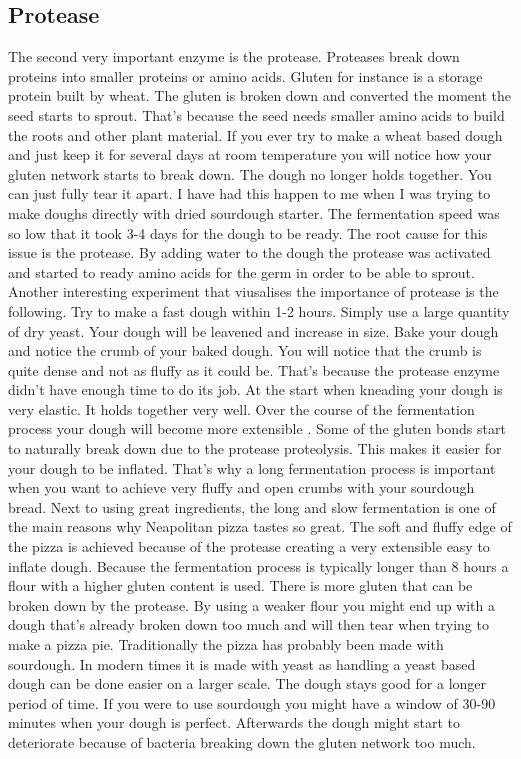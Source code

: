 \subsection{Protease}

The second very important enzyme is the protease. Proteases
break down proteins into smaller proteins or amino acids.
Gluten for instance is a storage protein built by wheat.
The gluten is broken down and converted the moment the
seed starts to sprout. That's because the seed needs
smaller amino acids to build the roots and other plant material.
If you ever try to make a wheat based dough and just keep
it for several days at room temperature you will notice
how your gluten network starts to break down. The dough
no longer holds together. You can just fully tear it apart.
I have had this happen to me when I was trying to make
doughs directly with dried sourdough starter. The fermentation
speed was so low that it took 3-4 days for the dough
to be ready. The root cause for this issue is the protease.
By adding water to the dough the protease was activated
and started to ready amino acids for the germ in order to be
able to sprout. Another interesting experiment that viusalises
the importance of protease is the following. Try to make a
fast dough within 1-2 hours. Simply use a large quantity
of dry yeast. Your dough will be leavened and increase in size.
Bake your dough and notice the crumb of your baked dough.
You will notice that the crumb is quite dense and not as
fluffy as it could be. That's because the protease enzyme
didn't have enough time to do its job. At the start
when kneading your dough is very elastic. It holds together
very well. Over the course of the fermentation process
your dough will become more extensible \cite{protease+enzyme+bread}.
Some of the gluten bonds start to naturally break
down due to the protease proteolysis. This makes it easier
for your dough to be inflated. That's why a long
fermentation process is important when you want to
achieve very fluffy and open crumbs with your sourdough
bread. Next to using great ingredients, the long and
slow fermentation is one of the main reasons why
Neapolitan pizza tastes so great. The soft and fluffy
edge of the pizza is achieved because of the protease
creating a very extensible easy to inflate dough. Because
the fermentation process is typically longer than 8
hours a flour with a higher gluten content is used. There
is more gluten that can be broken down by the protease.
By using a weaker flour you might end up with a dough
that's already broken down too much and will then tear
when trying to make a pizza pie. Traditionally the pizza
has probably been made with sourdough. In modern times
it is made with yeast as handling a yeast based
dough can be done easier on a larger scale. The dough
stays good for a longer period of time. If you were to use
sourdough you might have a window of 30-90 minutes when
your dough is perfect. Afterwards the dough might
start to deteriorate because of bacteria breaking
down the gluten network too much.

